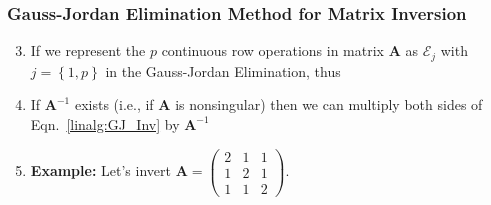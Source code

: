 \documentclass[10pt,compress]{beamer}
\begin{document}
\begin{frame}
  \frametitle{Gauss-Jordan Elimination Method for Matrix Inversion} 
  \begin{enumerate}
  \setcounter{enumi}{2}
     \item <1-> If we represent the $p$ continuous row operations in matrix $\bm{A}$ as $\mathcal{E}_{j}$ with $j=\left\{1,p\right\}$ in the Gauss-Jordan Elimination, thus
     \item <3-> If $\bm{A}^{-1}$ exists (i.e., if $\bm{A}$ is nonsingular) then we can multiply both sides of Eqn.~\ref{linalg:GJ_Inv} by $\bm{A}^{-1}$
     \item <5-> {\bf Example:} Let's invert $\bm{A} = \begin{pmatrix}2 & 1 & 1 \\ 1 & 2 & 1 \\ 1 & 1 & 2\end{pmatrix}$.
          
  \end{enumerate}
\end{frame}
\end{document}
